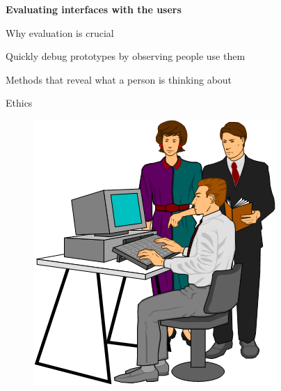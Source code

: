 \documentclass[pdf]{beamer}
\begin{document}
{
\begin{frame}
\bigskip
\bigskip
\bigskip
      \textbf{\LARGE Evaluating interfaces with the users \LARGE}
\bigskip
\bigskip
\bigskip

Why evaluation is crucial 

Quickly debug prototypes by observing people use them

Methods that reveal what a person is thinking about 

Ethics
    \begin{figure}[b]
    	\includegraphics[scale = 0.4, right]{1_img.png}
    \end{figure}
\end{frame}}



\end{document}
